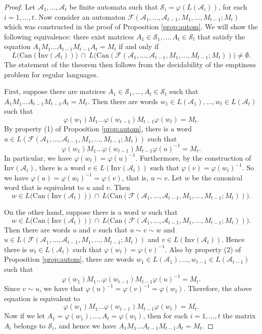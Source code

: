 \documentclass[fontsize=11pt,DIV=13,paper=letter]{scrartcl}
\theoremstyle{definition}
\newcommand{\A}{\mathcal{A}}
\newcommand{\F}{\mathcal{F}}
\newcommand{\s}{\mathcal{S}}
\renewcommand{\phi}{\varphi}
\begin{document}
\begin{proof}
Let $\A_1,\dots,\A_t$ be finite automata such that $\s_i=\phi(L(\A_i))$, for each $i=1,\dots,t$. Now consider an automaton $\F(\A_1,\dots,\A_{t-1},M_1,\dots,M_{t-1};M_t)$ which was constructed in the proof of Proposition \ref{prop:autom}. We will show the following equivalence: there exist matrices $A_1\in \s_1,\dots,A_t\in \s_t$ that satisfy the equation $A_1M_1\dots A_{t-1}M_{t-1}A_t= M_t$ if and only if
\[
L\big(\mathrm{Can}(\mathrm{Inv}(\A_t))\big)\ \cap\ L\big(\mathrm{Can}(\F(\A_1,\dots,\A_{t-1},M_1,\dots,M_{t-1};M_t))\big) \neq \emptyset.
\]
The statement of the theorem then follows from the decidability of the emptiness problem for regular languages. 

First, suppose there are matrices $A_1\in \s_1,\dots,A_t\in \s_t$ such that $A_1M_1\dots A_{t-1}M_{t-1}A_t= M_t$. Then there are words $w_1\in L(\A_1),\dots,w_t\in L(\A_t)$ such that
\[
\phi(w_1)M_1\dots \phi(w_{t-1})M_{t-1}\phi(w_t)=M_t.
\]
By property (1) of Proposition \ref{prop:autom}, there is a word $u\in L(\F(\A_1,\dots,\A_{t-1},M_1,\dots,M_{t-1};M_t))$ such that
\[
\phi(w_1)M_1\dots \phi(w_{t-1})M_{t-1}\phi(u)^{-1}=M_t.
\]
In particular, we have $\phi(w_t)=\phi(u)^{-1}$. Furthermore, by the construction of $\mathrm{Inv}(\A_t)$, there is a word $v\in L(\mathrm{Inv}(\A_t))$ such that $\phi(v)=\phi(w_t)^{-1}$. So we have $\phi(u)=\phi(w_t)^{-1}=\phi(v)$, that is, $u\sim v$. Let $w$ be the canonical word that is equivalent to $u$ and $v$. Then
\[
w\in L\big(\mathrm{Can}(\mathrm{Inv}(\A_t))\big)\ \cap\ L\big(\mathrm{Can}(\F(\A_1,\dots,\A_{t-1},M_1,\dots,M_{t-1};M_t))\big).
\]

On the other hand, suppose there is a word $w$ such that
\[
w\in L\big(\mathrm{Can}(\mathrm{Inv}(\A_t))\big)\ \cap\ L\big(\mathrm{Can}(\F(\A_1,\dots,\A_{t-1},M_1,\dots,M_{t-1};M_t))\big).
\]
Then there are words $u$ and $v$ such that $u\sim v\sim w$ and $u\in L(\F(\A_1,\dots,\A_{t-1},M_1,\dots,M_{t-1};M_t))$ and $v\in L(\mathrm{Inv}(\A_t))$. Hence there is $w_t\in L(\A_t)$ such that $\phi(w_t)=\phi(v)^{-1}$. Also by property (2) of Proposition \ref{prop:autom}, there are words $w_1\in L(\A_1),\dots,w_{t-1}\in L(\A_{t-1})$ such that
\[
\phi(w_1)M_1\dots \phi(w_{t-1})M_{t-1}\phi(u)^{-1}=M_t.
\]
Since $v\sim u$, we have that $\phi(u)^{-1}=\phi(v)^{-1}=\phi(w_t)$. Therefore, the above equation is equivalent to
\[
\phi(w_1)M_1\dots \phi(w_{t-1})M_{t-1}\phi(w_t)=M_t.
\]
Now if we let $A_1=\phi(w_1),\dots,A_t=\phi(w_t)$, then for each $i=1,\dots,t$ the matrix $A_i$ belongs to $\s_i$, and hence we have $A_1M_1\dots A_{t-1}M_{t-1}A_t= M_t$.

\end{proof}
\end{document}
